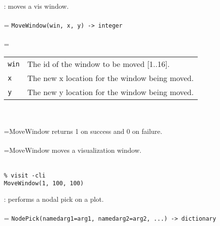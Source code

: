 \documentclass[10pt,a4paper]{report}
\begin{document}
{}
: moves a vis window.\\[-3mm]

 \\ 
\hangindent=\parindent 
\verb!MoveWindow(win, x, y) -> integer!\\ [-3mm]

 \\ 
\hangindent=\parindent 
\begin{tabular}{lp{9cm}}
\verb!win! & The id of the window to be moved [1..16]. \\
\verb!x! & The new x location for the window being moved. \\
\verb!y! & The new y location for the window being moved. \\
\end{tabular} \\[-2mm]


 \\ 
\hangindent=\parindent MoveWindow returns 1 on success and 0 on failure. \\[-3mm] 

 \\ 
\hangindent=\parindent MoveWindow moves a visualization window. \\[-3mm] 

\\[-6mm]
\begin{verbatim}% visit -cli
MoveWindow(1, 100, 100)
\end{verbatim}
\newpage


{}
: performs a nodal pick on a plot.\\[-3mm]

 \\ 
\hangindent=\parindent 
\verb!NodePick(namedarg1=arg1, namedarg2=arg2, ...) -> dictionary!\\ [-3mm]
\end{document}
